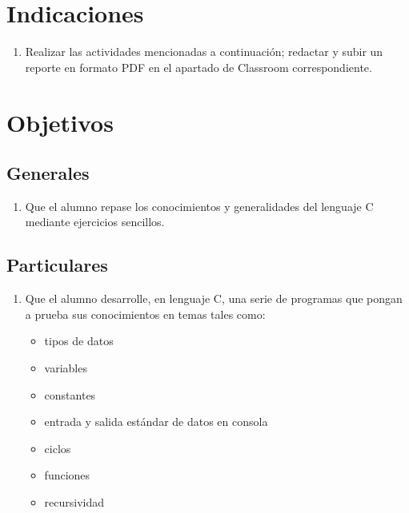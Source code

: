 \documentclass[10pt,letterpaper]{article}
\begin{document}
\section{Indicaciones}
\begin{enumerate}[label=(\roman*)]
    \item Realizar las actividades mencionadas a continuación; redactar y subir un reporte en formato PDF en el apartado de Classroom correspondiente.
\end{enumerate}
\section{Objetivos}
\subsection{Generales}
\begin{enumerate}[label=\arabic*)]
    \item Que el alumno repase los conocimientos y generalidades del lenguaje C mediante ejercicios sencillos.
\end{enumerate}
\subsection{Particulares}
\begin{enumerate}
    \item Que el alumno desarrolle, en lenguaje C, una serie de programas que pongan a prueba sus conocimientos en temas tales como:
    \begin{itemize}
        \item tipos de datos
        \item variables
        \item constantes
        \item entrada y salida estándar de datos en consola
        \item ciclos
        \item funciones
        \item recursividad
    \end{itemize} 
\end{enumerate}
\end{document}
